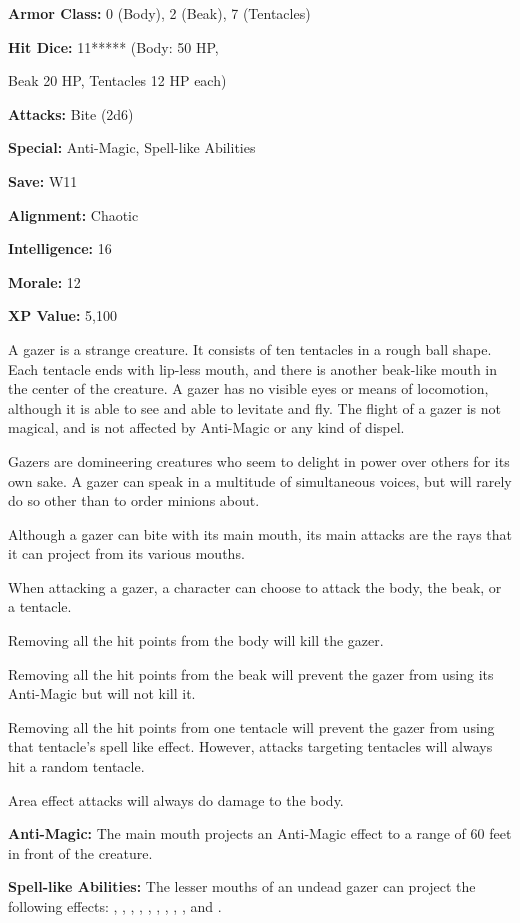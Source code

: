 \begin{multicols*}{2}
{\textbf{Armor Class:} 0 (Body), 2 (Beak), 7 (Tentacles)

\textbf{Hit Dice:} 11***** (Body: 50 HP, 

Beak 20 HP, Tentacles 12 HP each)

\textbf{Attacks:} Bite (2d6)

\textbf{Special:} Anti-Magic, Spell-like Abilities

\textbf{Save:} W11

\textbf{Alignment:} Chaotic

\textbf{Intelligence:} 16

\textbf{Morale:} 12

\textbf{XP Value:} 5,100}

A gazer is a strange creature. It consists of ten tentacles in a rough ball shape. Each tentacle ends with lip-less mouth, and there is another beak-like mouth in the center of the creature. A gazer has no visible eyes or means of locomotion, although it is able to see and able to levitate and fly. The flight of a gazer is not magical, and is not affected by Anti-Magic or any kind of dispel.

Gazers are domineering creatures who seem to delight in power over others for its own sake. A gazer can speak in a multitude of simultaneous voices, but will rarely do so other than to order minions about.

Although a gazer can bite with its main mouth, its main attacks are the rays that it can project from its various mouths.

When attacking a gazer, a character can choose to attack the body, the beak, or a tentacle.

Removing all the hit points from the body will kill the gazer.

Removing all the hit points from the beak will prevent the gazer from using its Anti-Magic but will not kill it.

Removing all the hit points from one tentacle will prevent the gazer from using that tentacle’s spell like effect. However, attacks targeting tentacles will always hit a random tentacle.

Area effect attacks will always do damage to the body.

\textbf{Anti-Magic:} The main mouth projects an Anti-Magic effect to a range of 60 feet in front of the creature.

\textbf{Spell-like Abilities:} The lesser mouths of an undead gazer can project the following effects: , , , , , , , , , and .


\end{multicols*}
